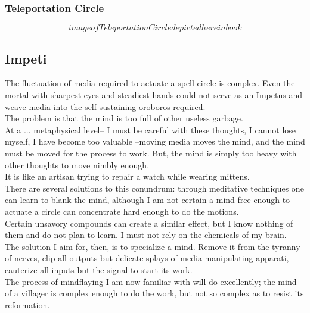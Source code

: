 \documentclass[12pt]{article}
\begin{document}
  \subsubsection*{Teleportation Circle}

  $$ image of Teleportation Circle depicted here in book $$
      


\newpage

\label{sec:greatwork/impetus}
\subsection*{Impeti}


  
    The fluctuation of media required to actuate a spell circle is complex. Even the mortal with sharpest eyes and steadiest hands could not serve as an Impetus and weave media into the self-sustaining oroboros required.\\The problem is that the mind is too full of other useless garbage.\\


  
    At a ... metaphysical level-- I must be careful with these thoughts, I cannot lose myself, I have become too valuable --moving media moves the mind, and the mind must be moved for the process to work. But, the mind is simply too heavy with other thoughts to move nimbly enough.\\It is like an artisan trying to repair a watch while wearing mittens.\\


  
    There are several solutions to this conundrum: through meditative techniques one can learn to blank the mind, although I am not certain a mind free enough to actuate a circle can concentrate hard enough to do the motions.\\Certain unsavory compounds can create a similar effect, but I know nothing of them and do not plan to learn. I must not rely on the chemicals of my brain.\\


  
    The solution I aim for, then, is to specialize a mind. Remove it from the tyranny of nerves, clip all outputs but delicate splays of media-manipulating apparati, cauterize all inputs but the signal to start its work.\\The process of mindflaying I am now familiar with will do excellently; the mind of a villager is complex enough to do the work, but not so complex as to resist its reformation.\\
\end{document}
